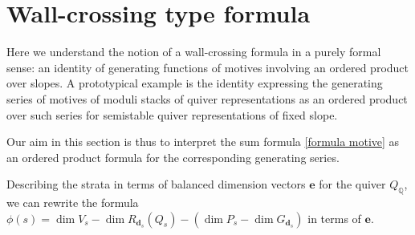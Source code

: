 \documentclass[pdftex]{sigma}
\numberwithin{equation}{section}
\theoremstyle{definition}
\begin{document}
\section{Wall-crossing type formula}\label{s5}

Here we understand the notion of a wall-crossing formula in a purely formal sense: an identity of generating functions of motives involving an ordered product over slopes. A prototypical example is the identity \cite[Theorem 2.4]{MozIntro} expressing the generating series of motives of moduli stacks of quiver representations as an ordered product over such series for semistable quiver representations of fixed slope.

Our aim in this section is thus to interpret the sum formula \eqref{formula motive} as an ordered product formula for the corresponding generating series.

Describing the strata in terms of balanced dimension vectors $\mathbf{e}$ for the quiver $Q_\mathbb{Q}$, we can rewrite the formula
$
\phi(s) = \dim V_s - \dim R_{\mathbf{d}_s} (Q_s) - (\dim P_s - \dim G_{\mathbf{d}_s})
$
in terms of $\mathbf{e}$.
\end{document}
